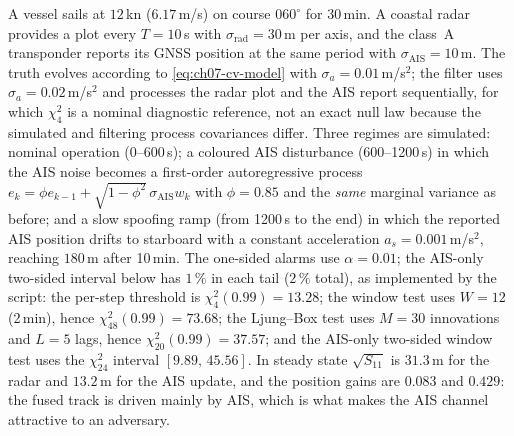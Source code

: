 \begin{example}
\label{ex:ch07-ais-innovation}
A vessel sails at $12$\,kn ($6.17$\,m/s) on course $060^{\circ}$ for 30\,min. A coastal radar provides a plot every $T=10$\,s with $\sigma_{\mathrm{rad}}=30$\,m per axis, and the class~A transponder reports its GNSS position at the same period with $\sigma_{\mathrm{AIS}}=10$\,m. The truth evolves according to \eqref{eq:ch07-cv-model} with $\sigma_a=0.01$\,m/s$^{2}$; the filter uses $\sigma_a=0.02$\,m/s$^{2}$ and processes the radar plot and the AIS report sequentially, for which $\chi^2_4$ is a nominal diagnostic reference, not an exact null law because the simulated and filtering process covariances differ. Three regimes are simulated: nominal operation (0--600\,s); a coloured AIS disturbance (600--1200\,s) in which the AIS noise becomes a first-order autoregressive process $e_k=\phi e_{k-1}+\sqrt{1-\phi^{2}}\,\sigma_{\mathrm{AIS}}w_k$ with $\phi=0.85$ and the \emph{same} marginal variance as before; and a slow spoofing ramp (from 1200\,s to the end) in which the reported AIS position drifts to starboard with a constant acceleration $a_s=0.001$\,m/s$^{2}$, reaching $180$\,m after 10\,min. The one-sided alarms use $\alpha=0.01$; the AIS-only two-sided interval below has $1\,\%$ in each tail ($2\,\%$ total), as implemented by the script: the per-step threshold is $\chi^{2}_{4}(0.99)=13.28$; the window test uses $W=12$ (2\,min), hence $\chi^{2}_{48}(0.99)=73.68$; the Ljung--Box test uses $M=30$ innovations and $L=5$ lags, hence $\chi^{2}_{20}(0.99)=37.57$; and the AIS-only two-sided window test uses the $\chi^{2}_{24}$ interval $[9.89,\,45.56]$. In steady state $\sqrt{S_{11}}$ is $31.3$\,m for the radar and $13.2$\,m for the AIS update, and the position gains are $0.083$ and $0.429$: the fused track is driven mainly by AIS, which is what makes the AIS channel attractive to an adversary.


\end{example}
